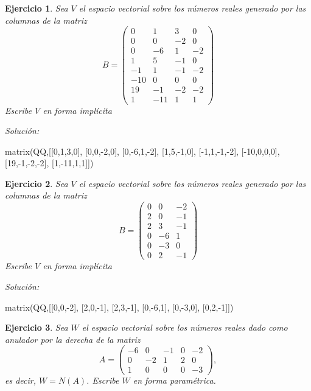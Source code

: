 \documentclass{amsart}
\newtheorem{ejer}{Ejercicio}
\begin{document}


\begin{ejer} Sea $V$ el espacio vectorial sobre los números reales 
generado por las columnas de la matriz 
\[B = \left(\begin{array}{rrrr}
0 & 1 & 3 & 0 \\
0 & 0 & -2 & 0 \\
0 & -6 & 1 & -2 \\
1 & 5 & -1 & 0 \\
-1 & 1 & -1 & -2 \\
-10 & 0 & 0 & 0 \\
19 & -1 & -2 & -2 \\
1 & -11 & 1 & 1
\end{array}\right)\]
Escribe $V$ en forma impl\'icita 
\end{ejer}

{\it Soluci\'on:}

\begin{sageblock}
matrix(QQ,[[0,1,3,0],
[0,0,-2,0],
[0,-6,1,-2],
[1,5,-1,0],
[-1,1,-1,-2],
[-10,0,0,0],
[19,-1,-2,-2],
[1,-11,1,1]])
\end{sageblock}



\begin{ejer} Sea $V$ el espacio vectorial sobre los números reales 
generado por las columnas de la matriz 
\[B = \left(\begin{array}{rrr}
0 & 0 & -2 \\
2 & 0 & -1 \\
2 & 3 & -1 \\
0 & -6 & 1 \\
0 & -3 & 0 \\
0 & 2 & -1
\end{array}\right)\]
Escribe $V$ en forma impl\'icita 
\end{ejer}

{\it Soluci\'on:}

\begin{sageblock}
matrix(QQ,[[0,0,-2],
[2,0,-1],
[2,3,-1],
[0,-6,1],
[0,-3,0],
[0,2,-1]])
\end{sageblock}



\begin{ejer} Sea $W$ el espacio vectorial sobre los números reales dado
como anulador por la derecha de la matriz 
\[A = \left(\begin{array}{rrrrr}
-6 & 0 & -1 & 0 & -2 \\
0 & -2 & 1 & 2 & 0 \\
1 & 0 & 0 & 0 & -3
\end{array}\right),\]
es decir, $W = N(A)$. Escribe $W$ en forma param\'etrica.
\end{ejer}
\end{document}
